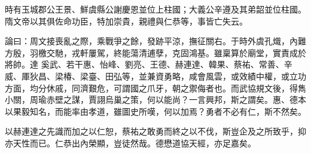 \begin{pinyinscope}
 時有玉城郡公王景、鮮虞縣公謝慶恩並位上柱國；大義公辛遵及其弟韶並位柱國。隋文帝以其俱佐命功臣，特加崇貴，親禮與仁恭等，事皆亡失云。



 論曰：周文接喪亂之際，乘戰爭之餘，發跡平涼，撫征關右。于時外虞孔熾，內難方殷，羽檄交馳，戎軒屢駕，終能蕩清逋孽，克固鴻基。雖稟算於廟堂，實責成於將帥。達
 奚武、若干惠、怡峰、劉亮、王德、赫連達、韓果、蔡祐、常善、辛威、厙狄昌、梁椿、梁臺、田弘等，並兼資勇略，咸會風雲，或效績中權，或立功方面，均分休戚，同濟艱危，可謂國之爪牙，朝之禦侮者也。而武協規文後，得雋小關，周瑜赤壁之謀，賈詡烏巢之策，何以能尚？一言興邦，斯之謂矣。惠、德本以果毅知名，而能率由孝道，雖圖史所嘆，何以加焉？勇者不必有仁，斯不然矣。



 以赫連達之先識而加之以仁恕，蔡祐之敢勇而終之以不伐，斯豈企及之所致乎，抑亦天性而已。仁恭出內榮顯，豈徒然哉。德懋道協天經，亦足嘉矣。



\end{pinyinscope}